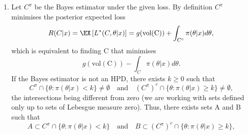 {\begin{enumerate}[label = \alph*)]
    If the volume needs to be large to ensure coverage, is better to pick a region with null volume. For example, consider the case of finding a HPD for the mean of a normal distribution. Under Jeffrey's prior the HPD will be the classical \textit{t} interval
    \begin{equation*}
        C(\Bar{x}, \Bar{s}^2) = \left(\Bar{x} - t_{\alpha} \sqrt{\frac{\Bar{s}^2}{n}}, \Bar{x} + t_{\alpha} \sqrt{\frac{\Bar{s}^2}{n}}\right).
    \end{equation*}
    The volume of the HPD above is twice the standard deviation term.
    If this volume is larger than 1, it is better to collapse the interval to a point if we are trying to minimise the loss. So the interval under this loss becomes
    \begin{equation*}
        C'(\Bar{x}, \Bar{s}^2) = \left\{\begin{split}  C(\Bar{x}&, \Bar{s}^2), \quad \sqrt{\Bar{s}^2} > \sqrt{n}/2t_{\alpha},  \\ \{\Bar{x}\}&, \quad \text{otherwise}.
        \end{split}\right.
    \end{equation*}
    This makes little sense, as one deposits essentially infinite certainty on a single point.
    See Section 5.5.3 in Robert (2007) for more details.
    \item Let $C^\pi$ be the Bayes estimator under the given loss. By definition $C^\pi$ minimises the posterior expected loss
    \begin{equation*}
        R(C|x) = \EX \left[ L^*(C , \theta | x) \right] = g(\operatorname{vol(C)}) + \int_{C^c} \pi(\theta|x) d\theta,
    \end{equation*}
    which is equivalent to finding C that minimises
    \begin{equation*}
        g(\operatorname{vol(C)}) - \int_{C} \pi(\theta|x) d\theta.
    \end{equation*}
    If the Bayes estimator is not an HPD, there exists $k \geq 0$ such that
    \begin{equation*}
        C^\pi \cap \{\theta: \pi(\theta|x) < k\} \neq \emptyset \quad \text{and} \quad (C^\pi)^c \cap \{\theta: \pi(\theta|x) \geq k\} \neq \emptyset,
    \end{equation*}
    the intersections being different from zero (we are working with sets defined only up to sets of Lebesgue measure zero). Thus, there exists sets A and B such that
    \begin{equation*}
        A \subset C^\pi \cap \{\theta: \pi(\theta|x) < k\}  \quad \text{and} \quad B \subset (C^\pi)^c \cap \{\theta: \pi(\theta|x) \geq k\} ,

\end{equation*}
\end{enumerate}}
